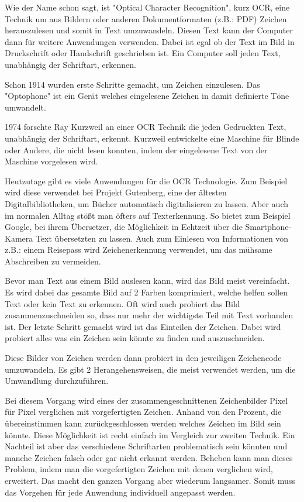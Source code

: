 

Wie der Name schon sagt, ist "Optical Character Recognition", kurz OCR, eine Technik um aus Bildern oder anderen Dokumentformaten (z.B.: PDF) Zeichen herauszulesen und somit in Text umzuwandeln. Diesen Text kann der Computer dann für weitere Anwendungen verwenden. Dabei ist egal ob der Text im Bild in Druckschrift oder Handschrift geschrieben ist. Ein Computer soll jeden Text, unabhängig der Schriftart, erkennen.


Schon 1914 wurden erste Schritte gemacht, um Zeichen einzulesen. Das "Optophone" ist ein Gerät welches eingelesene Zeichen in damit definierte Töne umwandelt.

1974 forschte Ray Kurzweil an einer OCR Technik die jeden Gedruckten Text, unabhängig der Schriftart, erkennt. Kurzweil entwickelte eine Maschine für Blinde oder Andere, die nicht lesen konnten, indem der eingelesene Text von der Maschine vorgelesen wird.

Heutzutage gibt es viele Anwendungen für die OCR Technologie. Zum Beispiel wird diese verwendet bei Projekt Gutenberg, eine der ältesten Digitalbibliotheken, um Bücher automatisch digitalisieren zu lassen. Aber auch im normalen Alltag stößt man öfters auf Texterkennung. So bietet zum Beispiel Google, bei ihrem Übersetzer, die Möglichkeit in Echtzeit über die Smartphone-Kamera Text übersetzten zu lassen. Auch zum Einlesen von Informationen von z.B.: einem Reisepass wird Zeichenerkennung verwendet, um das mühsame Abschreiben zu vermeiden.


Bevor man Text aus einem Bild auslesen kann, wird das Bild meist vereinfacht. Es wird dabei das gesamte Bild auf 2 Farben komprimiert, welche helfen sollen Text oder kein Text zu erkennen. Oft wird auch probiert das Bild zusammenzuschneiden so, dass nur mehr der wichtigste Teil mit Text vorhanden ist. Der letzte Schritt gemacht wird ist das Einteilen der Zeichen. Dabei wird probiert alles was ein Zeichen sein könnte zu finden und auszuschneiden.

Diese Bilder von Zeichen werden dann probiert in den jeweiligen Zeichencode
umzuwandeln. Es gibt 2 Herangehensweisen, die meist verwendet werden, um die Umwandlung durchzuführen.


Bei diesem Vorgang wird eines der zusammengeschnittenen Zeichenbilder Pixel für Pixel verglichen mit vorgefertigten Zeichen. Anhand von den Prozent, die übereinstimmen kann zurückgeschlossen werden welches Zeichen im Bild sein könnte. Diese Möglichkeit ist recht einfach im Vergleich zur zweiten Technik. Ein Nachteil ist aber das verschiedene Schriftarten problematisch sein könnten und manche Zeichen falsch oder gar nicht erkannt werden. Beheben kann man dieses Problem, indem man die vorgefertigten Zeichen mit denen verglichen wird, erweitert. Das macht den ganzen Vorgang aber wiederum langsamer. Somit muss das Vorgehen für jede Anwendung individuell angepasst werden.


